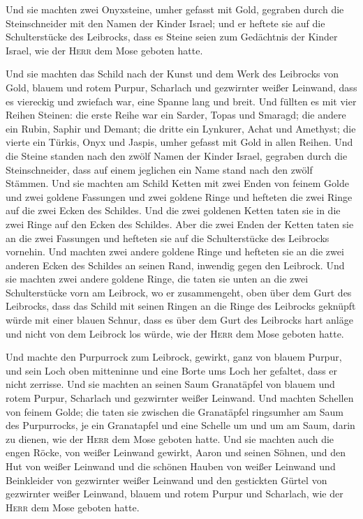  Und sie machten zwei Onyxsteine, umher gefasst mit Gold,
gegraben durch die Steinschneider mit den Namen der Kinder Israel;
 und er heftete sie auf die Schulterstücke des Leibrocks,
dass es Steine seien zum Gedächtnis der Kinder Israel, wie der
\textsc{Herr} dem Mose geboten hatte.

 Und sie machten das Schild nach der Kunst und dem Werk
des Leibrocks von Gold, blauem und rotem Purpur, Scharlach und
gezwirnter weißer Leinwand,  dass es viereckig und
zwiefach war, eine Spanne lang und breit.  Und füllten es
mit vier Reihen Steinen: die erste Reihe war ein Sarder, Topas und
Smaragd;  die andere ein Rubin, Saphir und Demant;
 die dritte ein Lynkurer, Achat und Amethyst;
 die vierte ein Türkis, Onyx und Jaspis, umher gefasst
mit Gold in allen Reihen.  Und die Steine standen nach
den zwölf Namen der Kinder Israel, gegraben durch die Steinschneider,
dass auf einem jeglichen ein Name stand nach den zwölf Stämmen.
 Und sie machten am Schild Ketten mit zwei Enden von
feinem Golde  und zwei goldene Fassungen und zwei goldene
Ringe und hefteten die zwei Ringe auf die zwei Ecken des Schildes.
 Und die zwei goldenen Ketten taten sie in die zwei Ringe
auf den Ecken des Schildes.  Aber die zwei Enden der
Ketten taten sie an die zwei Fassungen und hefteten sie auf die
Schulterstücke des Leibrocks vornehin.  Und machten zwei
andere goldene Ringe und hefteten sie an die zwei anderen Ecken des
Schildes an seinen Rand, inwendig gegen den Leibrock. 
Und sie machten zwei andere goldene Ringe, die taten sie unten an die
zwei Schulterstücke vorn am Leibrock, wo er zusammengeht, oben über dem
Gurt des Leibrocks,  dass das Schild mit seinen Ringen an
die Ringe des Leibrocks geknüpft würde mit einer blauen Schnur, dass es
über dem Gurt des Leibrocks hart anläge und nicht von dem Leibrock los
würde, wie der \textsc{Herr} dem Mose geboten hatte.

 Und machte den Purpurrock zum Leibrock, gewirkt, ganz
von blauem Purpur,  und sein Loch oben mitteninne und
eine Borte ums Loch her gefaltet, dass er nicht zerrisse.
 Und sie machten an seinen Saum Granatäpfel von blauem
und rotem Purpur, Scharlach und gezwirnter weißer Leinwand.
 Und machten Schellen von feinem Golde; die taten sie
zwischen die Granatäpfel ringsumher am Saum des Purpurrocks,
 je ein Granatapfel und eine Schelle um und um am Saum,
darin zu dienen, wie der \textsc{Herr} dem Mose geboten hatte.
 Und sie machten auch die engen Röcke, von weißer
Leinwand gewirkt, Aaron und seinen Söhnen,  und den Hut
von weißer Leinwand und die schönen Hauben von weißer Leinwand und
Beinkleider von gezwirnter weißer Leinwand  und den
gestickten Gürtel von gezwirnter weißer Leinwand, blauem und rotem
Purpur und Scharlach, wie der \textsc{Herr} dem Mose geboten hatte.

